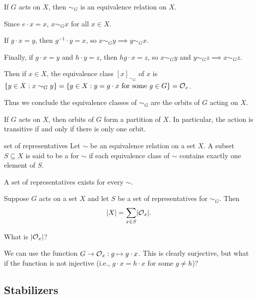 \documentclass[12pt,letterpaper]{report}
\begin{document}
\begin{lem}{}{}
  If $G$ acts on $X$, then $\sim_G$ is an equivalence relation on $X$.
\end{lem}

\begin{thmproof}
  Since $e \cdot x = x$, $x \sim_G x$ for all $x \in X$.

  If $g \cdot x = y$, then $g^{-1} \cdot y = x$, so $x \sim_G y \implies y \sim_G x$.

  Finally, if $g \cdot x = y$ and $h \cdot y = z$, then $hg \cdot x = z$, so $x \sim_G y$ and
  $y \sim_G z \implies x \sim_G z$.
\end{thmproof}

Then if $x \in X$, the equivalence class $[x]_{\sim_G}$ of $x$ is
$\{y \in X : x \sim_G y\} = \{y \in X : y = g \cdot x \text{ for some } g \in G\} = \mathcal{O}_x$.

Thus we conclude the equivalence classes of $\sim_G$ are the orbits of $G$ acting on $X$.

\begin{prop}{}{}
  If $G$ acts on $X$, then orbits of $G$ form a partition of $X$.
  In particular, the action is transitive if and only if there is only one orbit.
\end{prop}

\begin{defn}{set of representatives}{}
  Let $\sim$ be an equivalence relation on a set $X$.
  A subset $S \subseteq X$ is said to be a  for $\sim$ if each
  equivalence class of $\sim$ contains exactly one element of $S$.
\end{defn}

A set of representatives exists for every $\sim$.

\begin{cor}{}{}
  Suppose $G$ acts on a set $X$ and let $S$ be a set of representatives for $\sim_G$.
  Then
  \[ \lvert X\rvert = \sum_{x \in S} \lvert\mathcal{O}_x\rvert. \]
\end{cor}

What is $\lvert\mathcal{O}_x\rvert$?

We can use the function $G \to \mathcal{O}_x : g \mapsto g \cdot x$.
This is clearly surjective, but what if the function is not injective (i.e., $g \cdot x = h \cdot x$
for some $g \neq h$)?

\pagebreak
\subsection{Stabilizers}
\end{document}
